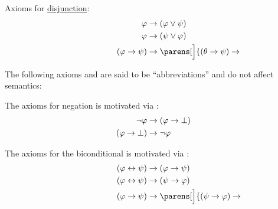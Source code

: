 \begin{definition}
\begin{thmenum}[series=def:minimal_propositional_axiomatic_derivation_system]
     Axioms for \hyperref[def:propositional_language/connectives/disjunction]{disjunction}:
    \begin{align}
      \mathllap{ \varphi }                    &\rightarrow \mathrlap{ (\varphi \vee \psi) } \label{eq:def:minimal_propositional_axiomatic_derivation_system/or_elim_left} \\
      \mathllap{ \varphi }                    &\rightarrow \mathrlap{ (\psi \vee \varphi) } \label{eq:def:minimal_propositional_axiomatic_derivation_system/or_elim_right} \\
      \mathllap{ (\varphi \rightarrow \psi) } &\rightarrow \mathrlap{ \parens[\Big]{ (\theta \rightarrow \psi) \rightarrow ((\varphi \vee \theta) \rightarrow \psi) } } \label{eq:def:minimal_propositional_axiomatic_derivation_system/or_intro}
    \end{align}
  \end{thmenum}

  The following axioms and are said to be \enquote{abbreviations} and do not affect semantics:
  \begin{thmenum}[resume=def:minimal_propositional_axiomatic_derivation_system]
     The axioms for negation is motivated via :
    \begin{align}
      \mathllap{ \neg \varphi }               &\rightarrow \mathrlap{ (\varphi \rightarrow \bot) } \label{eq:def:minimal_propositional_axiomatic_derivation_system/neg_elim} \\
      \mathllap{ (\varphi \rightarrow \bot) } &\rightarrow \mathrlap{ \neg \varphi } \label{eq:def:minimal_propositional_axiomatic_derivation_system/neg_intro}
    \end{align}

     The axioms for the biconditional is motivated via :
    \begin{align}
      \mathllap{ (\varphi \leftrightarrow \psi)  }&\rightarrow \mathrlap{ (\varphi \rightarrow \psi) } \label{eq:def:minimal_propositional_axiomatic_derivation_system/equiv_elim_left} \\
      \mathllap{ (\varphi \leftrightarrow \psi) } &\rightarrow \mathrlap{ (\psi \rightarrow \varphi) } \label{eq:def:minimal_propositional_axiomatic_derivation_system/equiv_elim_right} \\
      \mathllap{ (\varphi \rightarrow \psi)     } &\rightarrow \mathrlap{ \parens[\Big]{ (\psi \rightarrow \varphi) \rightarrow (\varphi \leftrightarrow \psi) } } \label{def:minimal_propositional_axiomatic_derivation_system/eq:equiv_intro}
    \end{align}
  \end{thmenum}
\end{definition}

